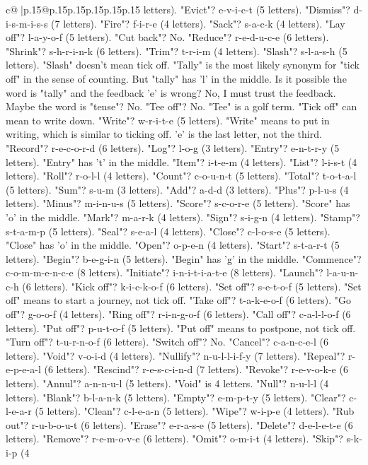 \documentclass{article}
\begin{document}
{\begin{supertabular}{c@{$\;$}|p{.15\linewidth}@{}p{.15\linewidth}p{.15\linewidth}p{.15\linewidth}p{.15\linewidth}p{.15\linewidth}}
{{{letters). "Evict"? e{-}v{-}i{-}c{-}t (5 letters). "Dismiss"? d{-}i{-}s{-}m{-}i{-}s{-}s (7 letters). "Fire"? f{-}i{-}r{-}e (4 letters). "Sack"? s{-}a{-}c{-}k (4 letters). "Lay off"? l{-}a{-}y{-}o{-}f (5 letters). "Cut back"? No. "Reduce"? r{-}e{-}d{-}u{-}c{-}e (6 letters). "Shrink"? s{-}h{-}r{-}i{-}n{-}k (6 letters). "Trim"? t{-}r{-}i{-}m (4 letters). "Slash"? s{-}l{-}a{-}s{-}h (5 letters). "Slash" doesn't mean tick off. "Tally" is the most likely synonym for "tick off" in the sense of counting. But "tally" has 'l' in the middle. Is it possible the word is "tally" and the feedback 'e' is wrong? No, I must trust the feedback. Maybe the word is "tense"? No. "Tee off"? No. "Tee" is a golf term. "Tick off" can mean to write down. "Write"? w{-}r{-}i{-}t{-}e (5 letters). "Write" means to put in writing, which is similar to ticking off. 'e' is the last letter, not the third. "Record"? r{-}e{-}c{-}o{-}r{-}d (6 letters). "Log"? l{-}o{-}g (3 letters). "Entry"? e{-}n{-}t{-}r{-}y (5 letters). "Entry" has 't' in the middle. "Item"? i{-}t{-}e{-}m (4 letters). "List"? l{-}i{-}s{-}t (4 letters). "Roll"? r{-}o{-}l{-}l (4 letters). "Count"? c{-}o{-}u{-}n{-}t (5 letters). "Total"? t{-}o{-}t{-}a{-}l (5 letters). "Sum"? s{-}u{-}m (3 letters). "Add"? a{-}d{-}d (3 letters). "Plus"? p{-}l{-}u{-}s (4 letters). "Minus"? m{-}i{-}n{-}u{-}s (5 letters). "Score"? s{-}c{-}o{-}r{-}e (5 letters). "Score" has 'o' in the middle. "Mark"? m{-}a{-}r{-}k (4 letters). "Sign"? s{-}i{-}g{-}n (4 letters). "Stamp"? s{-}t{-}a{-}m{-}p (5 letters). "Seal"? s{-}e{-}a{-}l (4 letters). "Close"? c{-}l{-}o{-}s{-}e (5 letters). "Close" has 'o' in the middle. "Open"? o{-}p{-}e{-}n (4 letters). "Start"? s{-}t{-}a{-}r{-}t (5 letters). "Begin"? b{-}e{-}g{-}i{-}n (5 letters). "Begin" has 'g' in the middle. "Commence"? c{-}o{-}m{-}m{-}e{-}n{-}c{-}e (8 letters). "Initiate"? i{-}n{-}i{-}t{-}i{-}a{-}t{-}e (8 letters). "Launch"? l{-}a{-}u{-}n{-}c{-}h (6 letters). "Kick off"? k{-}i{-}c{-}k{-}o{-}f (6 letters). "Set off"? s{-}e{-}t{-}o{-}f (5 letters). "Set off" means to start a journey, not tick off. "Take off"? t{-}a{-}k{-}e{-}o{-}f (6 letters). "Go off"? g{-}o{-}o{-}f (4 letters). "Ring off"? r{-}i{-}n{-}g{-}o{-}f (6 letters). "Call off"? c{-}a{-}l{-}l{-}o{-}f (6 letters). "Put off"? p{-}u{-}t{-}o{-}f (5 letters). "Put off" means to postpone, not tick off. "Turn off"? t{-}u{-}r{-}n{-}o{-}f (6 letters). "Switch off"? No. "Cancel"? c{-}a{-}n{-}c{-}e{-}l (6 letters). "Void"? v{-}o{-}i{-}d (4 letters). "Nullify"? n{-}u{-}l{-}l{-}i{-}f{-}y (7 letters). "Repeal"? r{-}e{-}p{-}e{-}a{-}l (6 letters). "Rescind"? r{-}e{-}s{-}c{-}i{-}n{-}d (7 letters). "Revoke"? r{-}e{-}v{-}o{-}k{-}e (6 letters). "Annul"? a{-}n{-}n{-}u{-}l (5 letters). "Void" is 4 letters. "Null"? n{-}u{-}l{-}l (4 letters). "Blank"? b{-}l{-}a{-}n{-}k (5 letters). "Empty"? e{-}m{-}p{-}t{-}y (5 letters). "Clear"? c{-}l{-}e{-}a{-}r (5 letters). "Clean"? c{-}l{-}e{-}a{-}n (5 letters). "Wipe"? w{-}i{-}p{-}e (4 letters). "Rub out"? r{-}u{-}b{-}o{-}u{-}t (6 letters). "Erase"? e{-}r{-}a{-}s{-}e (5 letters). "Delete"? d{-}e{-}l{-}e{-}t{-}e (6 letters). "Remove"? r{-}e{-}m{-}o{-}v{-}e (6 letters). "Omit"? o{-}m{-}i{-}t (4 letters). "Skip"? s{-}k{-}i{-}p (4 }}}
\end{supertabular}}
\end{document}
